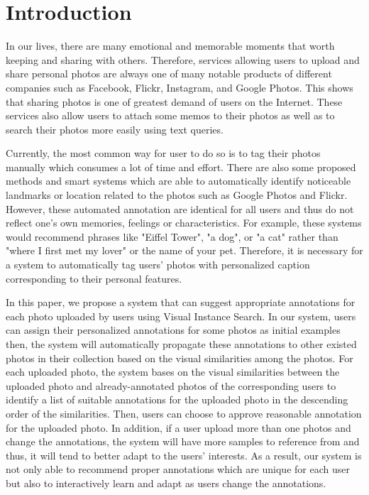 % 

\section{Introduction} \label{section:introduction}

In our lives, there are many emotional and memorable moments that worth keeping and sharing with others. Therefore, services allowing users to upload and share personal photos are always one of many notable products of different companies such as Facebook, Flickr, Instagram, and Google Photos. This shows that sharing photos is one of greatest demand of users on the Internet. These services also allow users to attach some memos to their photos as well as to search their photos more easily using text queries.

Currently, the most common way for user to do so is to tag their photos manually which consumes a lot of time and effort. There are also some proposed methods \cite{icml2013_chen13e,Lan_2013_CVPR} and smart systems which are able to automatically identify noticeable landmarks or location related to the photos such as Google Photos and Flickr. However, these automated annotation are identical for all users and thus do not reflect one's own memories, feelings or characteristics. For example, these systems would recommend phrases like "Eiffel Tower", "a dog", or "a cat" rather than "where I first met my lover" or the name of your pet. Therefore, it is necessary for a system to automatically tag users' photos with personalized caption corresponding to their personal features.

In this paper, we propose a system that can suggest appropriate annotations for each photo uploaded by users using Visual Instance Search. In our system, users can assign their personalized annotations for some photos as initial examples then, the system will automatically propagate these annotations to other existed photos in their collection based on the visual similarities among the photos. For each uploaded photo, the system bases on the visual similarities between the uploaded photo and already-annotated photos of the corresponding users to identify a list of suitable annotations for the uploaded photo in the descending order of the similarities. Then, users can choose to approve reasonable annotation for the uploaded photo. In addition, if a user upload more than one photos and change the annotations, the system will have more samples to reference from and thus, it will tend to better adapt to the users' interests. As a result, our system is not only able to recommend proper annotations which are unique for each user but also to interactively learn and adapt as users change the annotations.

